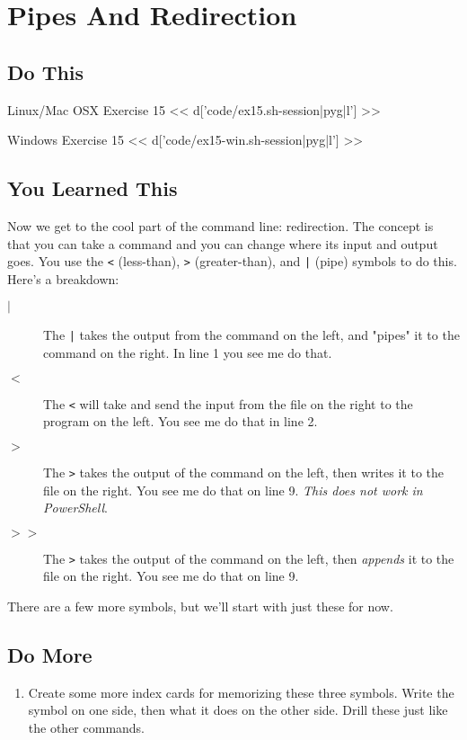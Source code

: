 \chapter{Pipes And Redirection}

\section{Do This}

\begin{code}{Linux/Mac OSX Exercise 15}
<< d['code/ex15.sh-session|pyg|l'] >>
\end{code}

\begin{code}{Windows Exercise 15}
<< d['code/ex15-win.sh-session|pyg|l'] >>
\end{code}

\section{You Learned This}

Now we get to the cool part of the command line: redirection.  The concept is
that you can take a command and you can change where its input and output goes. 
You use the \verb|<| (less-than), \verb|>| (greater-than), and \verb,|, (pipe) 
symbols to do this.  Here's a breakdown:

\begin{description}
\item[$|$] The \verb,|, takes the output from the command on the left, and "pipes" it to the command on the right.  In line 1 you see me do that.
\item[$<$] The \verb|<| will take and send the input from the file on the right to the program on the left.  You see me do that in line 2.
\item[$>$] The \verb|>| takes the output of the command on the left, then writes it
    to the file on the right.  You see me do that on line 9. \emph{This does not work in PowerShell}.
\item[$>>$] The \verb|>| takes the output of the command on the left, then \emph{appends} it
    to the file on the right.  You see me do that on line 9.
\end{description}

There are a few more symbols, but we'll start with just these for now.

\section{Do More}

\begin{enumerate}
\item Create some more index cards for memorizing these three symbols.  Write the symbol on one side, then what it does on the other side.  Drill these just like the other commands.
\end{enumerate}


